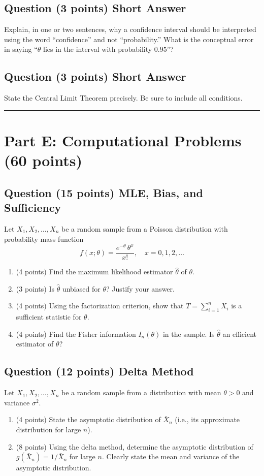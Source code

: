 \documentclass[11pt]{article}
\newcounter{qnum}
\newcommand{\question}[2]{\stepcounter{qnum}\subsection*{Question \theqnum \quad (#1 points) \hfill #2}}
\begin{document}
\vspace{2.5in}

\question{3}{Short Answer}
Explain, in one or two sentences, why a confidence interval should be interpreted using the word ``confidence'' and not ``probability.'' What is the conceptual error in saying ``$\theta$ lies in the interval with probability $0.95$''?

\vspace{1.5in}

\question{3}{Short Answer}
State the Central Limit Theorem precisely. Be sure to include all conditions.

\vspace{1.5in}

\bigskip
\hrule
\bigskip

\section{Part E: Computational Problems \hfill (60 points)}

\question{15}{MLE, Bias, and Sufficiency}
Let $X_1, X_2, \ldots, X_n$ be a random sample from a Poisson distribution with probability mass function
$$f(x; \theta) = \frac{e^{-\theta}\,\theta^x}{x!}, \quad x = 0, 1, 2, \ldots$$

\begin{enumerate}[label=(\alph*)]
\item (4 points) Find the maximum likelihood estimator $\hat\theta$ of $\theta$.
\item (3 points) Is $\hat\theta$ unbiased for $\theta$? Justify your answer.
\item (4 points) Using the factorization criterion, show that $T = \sum_{i=1}^n X_i$ is a sufficient statistic for $\theta$.
\item (4 points) Find the Fisher information $I_n(\theta)$ in the sample. Is $\hat\theta$ an efficient estimator of $\theta$?
\end{enumerate}

\newpage

\question{12}{Delta Method}
Let $X_1, X_2, \ldots, X_n$ be a random sample from a distribution with mean $\theta > 0$ and variance $\sigma^2$.

\begin{enumerate}[label=(\alph*)]
\item (4 points) State the asymptotic distribution of $\bar X_n$ (i.e., its approximate distribution for large $n$).
\item (8 points) Using the delta method, determine the asymptotic distribution of $g(\bar X_n) = 1/\bar X_n$ for large $n$. Clearly state the mean and variance of the asymptotic distribution.
\end{enumerate}
\end{document}
